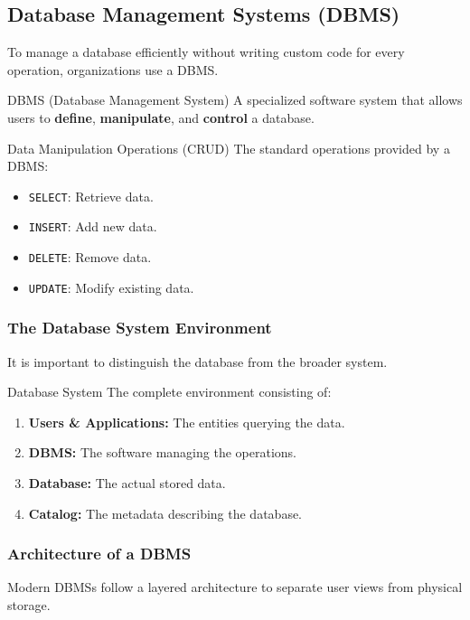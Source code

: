 \subsection{Database Management Systems (DBMS)}
To manage a database efficiently without writing custom code for every operation, organizations use a DBMS.

\begin{defbox}{DBMS (Database Management System)}
A specialized software system that allows users to \textbf{define}, \textbf{manipulate}, and \textbf{control} a database.
\end{defbox}

\begin{defbox}{Data Manipulation Operations (CRUD)}
The standard operations provided by a DBMS:
\begin{itemize}
    \item \texttt{SELECT}: Retrieve data.
    \item \texttt{INSERT}: Add new data.
    \item \texttt{DELETE}: Remove data.
    \item \texttt{UPDATE}: Modify existing data.
\end{itemize}
\end{defbox}

\subsubsection{The Database System Environment}
It is important to distinguish the database from the broader system.

\begin{defbox}{Database System}
The complete environment consisting of:
\begin{enumerate}
    \item \textbf{Users \& Applications:} The entities querying the data.
    \item \textbf{DBMS:} The software managing the operations.
    \item \textbf{Database:} The actual stored data.
    \item \textbf{Catalog:} The metadata describing the database.
\end{enumerate}
\end{defbox}

\subsubsection{Architecture of a DBMS}
Modern DBMSs follow a layered architecture to separate user views from physical storage.

